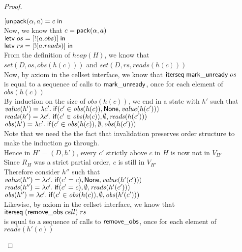 \begin{proof}
\begin{tabbedproof}
\oooo $[\mathsf{unpack}({\alpha}, {a}) = {c} \;\mathsf{in}\;{}$ \\
\oooo Now, we know that $c = \mathsf{pack}({\alpha}, {a})$ \\
\oooo $\mathsf{letv}\;os = [!(a.obs)]\;\mathsf{in}\;$ \\
\oooo $\mathsf{letv}\;rs = [!(a.reads)]\;\mathsf{in}\;$ \\
\oooo From the definition of $\mathit{heap}(H)$, we know that  \\
\oooo $\mathit{set}(D, os, \mathit{obs}(h(c)))$ and $\mathit{set}(D, rs, \mathit{reads}(h(c)))$ \\
\oooo Now, by axiom in the cellset interface, we know that $\mathsf{iterseq\;mark\_unready}\;os$ \\
\ooox is equal to a sequence of calls to $\mathsf{mark\_unready}$, once for each element of $\mathit{obs}(h(c))$\\
\oooo By induction on the size of $\mathit{obs}(h(c))$, we end in a state with $h'$ such that \\
\oooox $\mathit{value}(h' ) = \lambda c'.\;\mathsf{if}({c'\in \mathit{obs}(h(c))}, {\mathsf{None}}, {\mathit{value}(h(c'))})$ \\
\oooox $\mathit{reads}(h') = \lambda c'.\;\mathsf{if}({c'\in \mathit{obs}(h(c))}, {\emptyset}, {\mathit{reads}(h(c'))})$ \\
\oooox $\mathit{obs}(h') = \lambda c'.\;\mathsf{if}({c'\in \mathit{obs}(h(c))}, {\emptyset}, {\mathit{obs}(h(c'))})$ \\
\oooo Note that we need the the fact that invalidation preserves order structure to  \\
\ooox make the induction go through. \\
\oooo Hence in $H' = (D,h')$, every $c'$ strictly above $c$ in $H$ is now not in $V_{H'}$ \\ 
\oooo Since $R_H$ was a strict partial order, $c$ is still in $V_{H'}$ \\
\oooo Therefore consider $h''$ such that   \\
\oooox $\mathit{value}(h'') = \lambda c'.\;\mathsf{if}({c' = c)}, {\mathsf{None}}, {\mathit{value}(h'(c'))})$ \\
\oooox $\mathit{reads}(h'') = \lambda c'.\;\mathsf{if}({c' = c)}, {\emptyset}, {\mathit{reads}(h'(c'))})$ \\
\oooox $\mathit{obs}(h'') = \lambda c'.\;\mathsf{if}({c'\in \mathit{obs}(h(c))}, {\emptyset}, {\mathit{obs}(h'(c'))})$ \\
\oooo Likewise, by axiom in the cellset interface, we know that $\mathsf{iterseq}\;(\mathsf{remove\_obs}\;cell)\;rs$ \\
\ooox is equal to a sequence of calls to $\mathsf{remove\_obs}$, once for each element of $\mathit{reads}(h'(c))$\\

\end{tabbedproof}
\end{proof}
